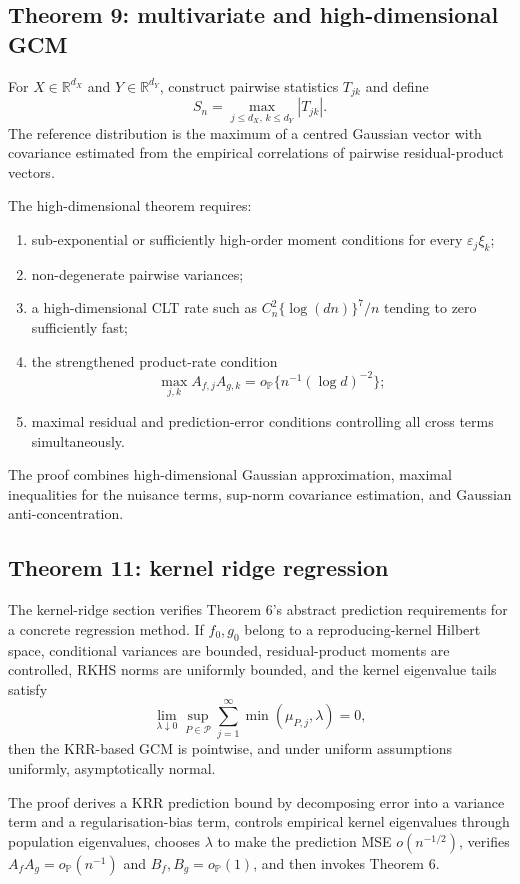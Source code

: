 \documentclass[11pt]{article}
\theoremstyle{definition}
\newcommand{\op}{o_{\mathbb{P}}}
\newcommand{\R}{\mathbb{R}}
\begin{document}
\subsection{Theorem 9: multivariate and high-dimensional GCM}

For $X\in\R^{d_X}$ and $Y\in\R^{d_Y}$, construct pairwise statistics $T_{jk}$ and define
\[
S_n=\max_{j\leq d_X,\,k\leq d_Y}|T_{jk}|.
\]
The reference distribution is the maximum of a centred Gaussian vector with covariance
estimated from the empirical correlations of pairwise residual-product vectors.

The high-dimensional theorem requires:
\begin{enumerate}[leftmargin=*]
\item sub-exponential or sufficiently high-order moment conditions for every
$\varepsilon_j\xi_k$;
\item non-degenerate pairwise variances;
\item a high-dimensional CLT rate such as
$C_n^2\{\log(dn)\}^7/n$ tending to zero sufficiently fast;
\item the strengthened product-rate condition
\[
\max_{j,k}A_{f,j}A_{g,k}
=\op\{n^{-1}(\log d)^{-2}\};
\]
\item maximal residual and prediction-error conditions controlling all cross terms
simultaneously.
\end{enumerate}
The proof combines high-dimensional Gaussian approximation, maximal inequalities for the
nuisance terms, sup-norm covariance estimation, and Gaussian anti-concentration.

\subsection{Theorem 11: kernel ridge regression}

The kernel-ridge section verifies Theorem 6's abstract prediction requirements for a concrete
regression method. If $f_0,g_0$ belong to a reproducing-kernel Hilbert space, conditional
variances are bounded, residual-product moments are controlled, RKHS norms are uniformly
bounded, and the kernel eigenvalue tails satisfy
\[
\lim_{\lambda\downarrow0}
\sup_{P\in\mathcal P}
\sum_{j=1}^{\infty}\min(\mu_{P,j},\lambda)=0,
\]
then the KRR-based GCM is pointwise, and under uniform assumptions uniformly, asymptotically
normal.

The proof derives a KRR prediction bound by decomposing error into a variance term and a
regularisation-bias term, controls empirical kernel eigenvalues through population eigenvalues,
chooses $\lambda$ to make the prediction MSE $o(n^{-1/2})$, verifies
$A_fA_g=\op(n^{-1})$ and $B_f,B_g=\op(1)$, and then invokes Theorem 6.
\end{document}
